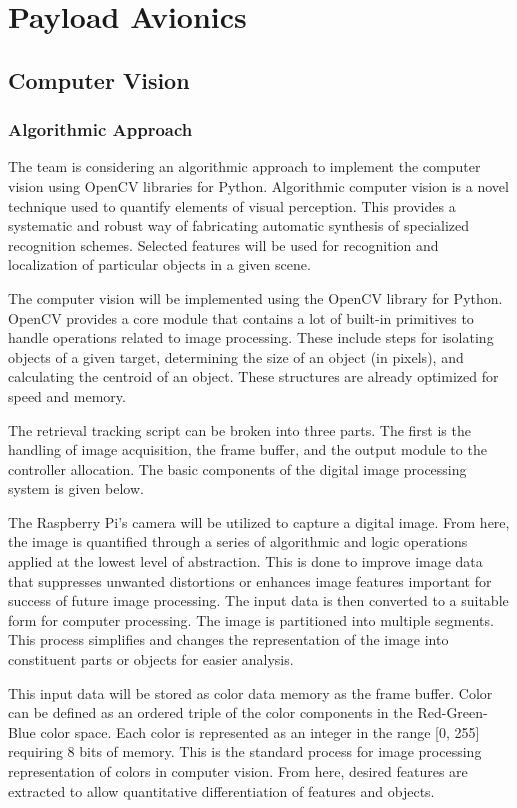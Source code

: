 \section{Payload Avionics}\label{PL:Tradeoffs:Avionics}
	\subsection{Computer Vision}
		\subsubsection{Algorithmic Approach}
        The team is considering an algorithmic approach to implement the computer vision using OpenCV libraries for Python. Algorithmic computer vision is a novel technique used to quantify elements of visual perception. This provides a systematic and robust way of fabricating automatic synthesis of specialized recognition schemes. Selected features will be used for recognition and localization of particular objects in a given scene. 

        The computer vision will be implemented using the OpenCV library for Python. OpenCV provides a core module that contains a lot of built-in primitives to handle operations related to image processing. These include steps for isolating objects of a given target, determining the size of an object (in pixels), and calculating the centroid of an object. These structures are already optimized for speed and memory. 
        
        The retrieval tracking script can be broken into three parts. The first is the handling of image acquisition, the frame buffer, and the output module to the controller allocation. The basic components of the digital image processing system is given below. 

        The Raspberry Pi’s camera will be utilized to capture a digital image. From here, the image is quantified through a series of algorithmic and logic operations applied at the lowest level of abstraction. This is done to improve image data that suppresses unwanted distortions or enhances image features important for success of future image processing. The input data is then converted to a suitable form for computer processing. The image is partitioned into multiple segments. This process simplifies and changes the representation of the image into constituent parts or objects for easier analysis.

        This input data will be stored as color data memory as the frame buffer. Color can be defined as an ordered triple of the color components in the Red-Green-Blue color space. Each color is represented as an integer in the range [0, 255] requiring 8 bits of memory. This is the standard process for image processing representation of colors in computer vision. From here, desired features are extracted to allow quantitative differentiation of features and objects.

